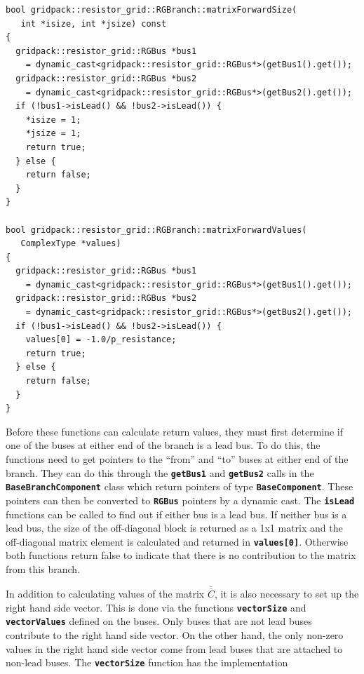\documentclass[12pt]{report} %
\begin{document}
{
\color{red}
\begin{Verbatim}[fontseries=b]
bool gridpack::resistor_grid::RGBranch::matrixForwardSize(
   int *isize, int *jsize) const
{
  gridpack::resistor_grid::RGBus *bus1
    = dynamic_cast<gridpack::resistor_grid::RGBus*>(getBus1().get());
  gridpack::resistor_grid::RGBus *bus2
    = dynamic_cast<gridpack::resistor_grid::RGBus*>(getBus2().get());
  if (!bus1->isLead() && !bus2->isLead()) {
    *isize = 1;
    *jsize = 1;
    return true;
  } else { 
    return false;
  }
}

bool gridpack::resistor_grid::RGBranch::matrixForwardValues(
   ComplexType *values)
{
  gridpack::resistor_grid::RGBus *bus1
    = dynamic_cast<gridpack::resistor_grid::RGBus*>(getBus1().get());
  gridpack::resistor_grid::RGBus *bus2
    = dynamic_cast<gridpack::resistor_grid::RGBus*>(getBus2().get());
  if (!bus1->isLead() && !bus2->isLead()) {
    values[0] = -1.0/p_resistance;
    return true;
  } else {
    return false;
  }
}
\end{Verbatim}
}

Before these functions can calculate return values, they must first determine if one of the buses at either end of the branch is a lead bus. To do this, the functions need to get pointers to the ``from'' and ``to'' buses at either end of the branch. They can do this through the \texttt{\textbf{getBus1}} and \texttt{\textbf{getBus2}} calls in the \texttt{\textbf{BaseBranchComponent}} class which return pointers of type \texttt{\textbf{BaseComponent}}. These pointers can then be converted to \texttt{\textbf{RGBus}} pointers by a dynamic cast. The \texttt{\textbf{isLead}} functions can be called to find out if either bus is a lead bus. If neither bus is a lead bus, the size of the off-diagonal block is returned as a 1x1 matrix and the off-diagonal matrix element is calculated and returned in \texttt{\textbf{values[0]}}. Otherwise both functions return false to indicate that there is no contribution to the matrix from this branch.

In addition to calculating values of the matrix $\overline{\overline{C}}$, it is also necessary to set up the right hand side vector. This is done via the functions \texttt{\textbf{vectorSize}} and \texttt{\textbf{vectorValues}} defined on the buses. Only buses that are not lead buses contribute to the right hand side vector. On the other hand, the only non-zero values in the right hand side vector come from lead buses that are attached to non-lead buses. The \texttt{\textbf{vectorSize}} function has the implementation
\end{document}
